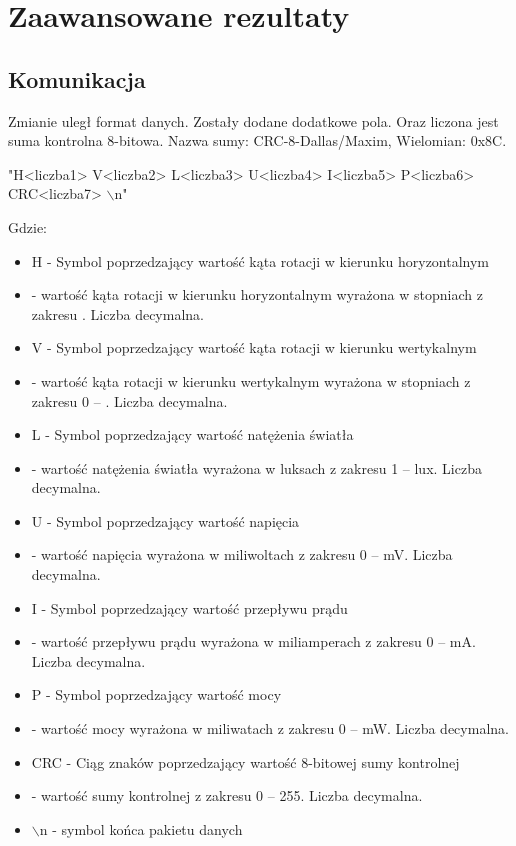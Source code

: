 \documentclass[10pt, a4paper]{article}
\begin{document}
\section{Zaawansowane rezultaty}
	\subsection{Komunikacja}
	Zmianie uległ format danych. Zostały dodane dodatkowe pola. Oraz liczona jest suma kontrolna 8-bitowa. Nazwa sumy: CRC-8-Dallas/Maxim, Wielomian: 0x8C.
		\begin{center}
			"H<liczba1> V<liczba2> L<liczba3> U<liczba4> I<liczba5> P<liczba6> CRC<liczba7> $\backslash$n"
		\end{center}
	Gdzie:
		\begin{itemize}
			\item H - Symbol poprzedzający wartość kąta rotacji w kierunku horyzontalnym
			\item <liczba1> - wartość kąta rotacji w kierunku horyzontalnym wyrażona w stopniach z zakresu \newline \unit[0 -- 360]{\textdegree}. Liczba decymalna.
			\item V - Symbol poprzedzający wartość kąta rotacji w kierunku wertykalnym
			\item <liczba2> - wartość kąta rotacji w kierunku wertykalnym wyrażona w stopniach z zakresu 0 -- \unit[180]{\textdegree}. Liczba decymalna.
			\item L - Symbol poprzedzający wartość natężenia światła
			\item <liczba3> - wartość natężenia światła wyrażona w luksach z zakresu 1 -- \unit[65535]{lux}. Liczba decymalna.
			\item U - Symbol poprzedzający wartość napięcia
			\item <liczba4> - wartość napięcia wyrażona w miliwoltach z zakresu 0 -- \unit[65535]{mV}. Liczba decymalna.
			\item I - Symbol poprzedzający wartość przepływu prądu
			\item <liczba5> - wartość przepływu prądu wyrażona w miliamperach z zakresu 0 -- \unit[65535]{mA}. Liczba decymalna.
			\item P - Symbol poprzedzający wartość mocy
			\item <liczba6> - wartość mocy wyrażona w miliwatach z zakresu 0 -- \unit[65535]{mW}. Liczba decymalna.
			\item CRC - Ciąg znaków poprzedzający wartość 8-bitowej sumy kontrolnej
			\item <liczba7> - wartość sumy kontrolnej z zakresu 0 -- 255. Liczba decymalna.
			\item $\backslash$n - symbol końca pakietu danych
		\end{itemize}
\end{document}
